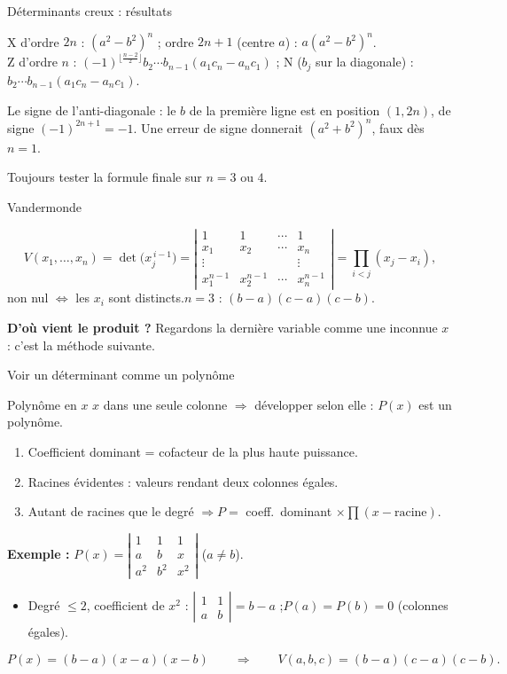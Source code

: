 \documentclass[aspectratio=169,11pt]{beamer}
\newcommand{\dt}[1]{\left|\begin{matrix}#1\end{matrix}\right|}
\begin{document}
\begin{frame}{Déterminants creux : résultats}
\begin{FORM}[Résultats --- TD 4, TD 9]
X d'ordre $2n$ : $(a^2-b^2)^n$ ; ordre $2n+1$ (centre $a$) : $a(a^2-b^2)^n$.\\
Z d'ordre $n$ : $(-1)^{\lfloor\frac{n-2}2\rfloor}b_2\cdots b_{n-1}(a_1c_n-a_nc_1)$ ;\quad
N ($b_j$ sur la diagonale) : $b_2\cdots b_{n-1}(a_1c_n-a_nc_1)$.
\end{FORM}
\pause
\begin{PIEGE}
Le signe de l'anti-diagonale : le $b$ de la première ligne est en position $(1,2n)$, de signe $(-1)^{2n+1}=-1$.
Une erreur de signe donnerait $(a^2+b^2)^n$, faux dès $n=1$.
\end{PIEGE}
\pause
\begin{RETENIR}
Toujours tester la formule finale sur $n=3$ ou $4$.
\end{RETENIR}
\end{frame}

\begin{frame}{Vandermonde}
\begin{FORM}
\[V(x_1,\dots,x_n)=\det\big(x_j^{\,i-1}\big)=\dt{1&1&\cdots&1\\x_1&x_2&\cdots&x_n\\\vdots&&&\vdots\\x_1^{n-1}&x_2^{n-1}&\cdots&x_n^{n-1}}=\prod_{i<j}(x_j-x_i),\]
non nul $\iff$ les $x_i$ sont distincts.\quad $n=3$ : $(b-a)(c-a)(c-b)$.
\end{FORM}
\pause
\textbf{D'où vient le produit ?} Regardons la dernière variable comme une inconnue $x$ : c'est la méthode suivante.
\end{frame}

\begin{frame}{Voir un déterminant comme un polynôme}
\begin{METH}{Polynôme en $x$}
$x$ dans une seule colonne $\Rightarrow$ développer selon elle : $P(x)$ est un polynôme.
\begin{enumerate}
\item Coefficient dominant = cofacteur de la plus haute puissance.
\item Racines évidentes : valeurs rendant deux colonnes égales.
\item Autant de racines que le degré $\Rightarrow P=$ coeff.\ dominant $\times\prod(x-\text{racine})$.
\end{enumerate}
\end{METH}
\pause
\textbf{Exemple :} $P(x)=\dt{1&1&1\\a&b&x\\a^2&b^2&x^2}$ ($a\neq b$).
\pause
\begin{itemize}
\item Degré $\leq2$, coefficient de $x^2$ : $\dt{1&1\\a&b}=b-a$ ;\quad $P(a)=P(b)=0$ (colonnes égales).
\end{itemize}
\pause
\[P(x)=(b-a)(x-a)(x-b)\qquad\Rightarrow\qquad V(a,b,c)=(b-a)(c-a)(c-b).\]
\end{frame}
\end{document}
